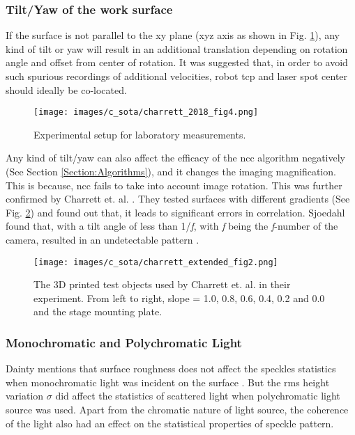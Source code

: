     \clearpage

    \subsubsection*{Tilt/Yaw of the work surface}\label{subsubsection:tilt_yaw}
    If the surface is not parallel to the xy plane (xyz axis as shown in Fig. \ref{fig:charrett_2018_fig4}), any kind of tilt or yaw will result in an additional translation depending on rotation angle and offset from center of rotation. It was suggested that, in order to avoid such spurious recordings of additional velocities, robot \gls{tcp} and laser spot center should ideally be co-located.

    \begin{figure}[h]
        \centering
        \texttt{[image: images/c\_sota/charrett\_2018\_fig4.png]}
        \caption{Experimental setup for laboratory measurements. \cite{charrett_2018}}
        \label{fig:charrett_2018_fig4}
    \end{figure}

    \noindent Any kind of tilt/yaw can also affect the efficacy of the \gls{ncc} algorithm negatively (See Section \ref{Section:Algorithms}), and it changes the imaging magnification. This is because, \gls{ncc} fails to take into account image rotation. This was further confirmed by Charrett et. al. \cite{charrett_extended_theory}. They tested surfaces with different gradients (See Fig. \ref{fig:charrett_extended_fig2}) and found out that, it leads to significant errors in correlation. Sjoedahl found that, with a tilt angle of less than 1/\emph{f}, with \emph{f} being the \emph{f}-number of the camera, resulted in an undetectable pattern \cite{sjoedahl}.
    
    \begin{figure}[h]
        \centering
        \texttt{[image: images/c\_sota/charrett\_extended\_fig2.png]}
        \caption{The 3D printed test objects used by Charrett et. al. in their experiment. From left to right, slope = 1.0, 0.8, 0.6, 0.4, 0.2 and 0.0 and the stage mounting plate. \cite{charrett_extended_theory}}
        \label{fig:charrett_extended_fig2}
    \end{figure}


    \subsubsection*{Monochromatic and Polychromatic Light}
    Dainty mentions that surface roughness does not affect the speckles statistics when monochromatic light was incident on the surface \cite{dainty}. But the \gls{rms} height variation $\sigma$ did affect the statistics of scattered light when polychromatic light source was used. Apart from the chromatic nature of light source, the coherence of the light also had an effect on the statistical properties of speckle pattern.

